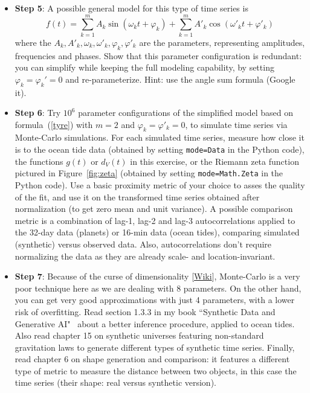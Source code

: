 \documentclass[oneside,10pt]{book}
\begin{document}
\begin{itemize}
\item[] {\bf Step 5}: A possible general model for this type of time series is
\begin{equation}
f(t) = \sum_{k=1}^m A_k \sin(\omega_kt + \varphi_k) + \sum_{k=1}^m A'_k \cos(\omega'_kt + \varphi'_k) \label{tyre}
\end{equation}
where the $A_k, A'_k, \omega_k,\omega'_k,\varphi_k,\varphi'_k$ are the parameters, representing amplitudes, frequencies and phases. Show that this parameter configuration is redundant:  you can simplify while keeping the full modeling capability, by setting
$\varphi_k = \varphi_k'=0$ and re-parameterize. Hint: use the angle sum formula (Google it).\vspace{1ex}
\item[] {\bf Step 6}: Try $10^6$ parameter configurations of the simplified model based on formula~(\ref{tyre}) 
with $m=2$ and $\varphi_k=\varphi'_k=0$, to
 simulate time series via \textcolor{index}{Monte-Carlo simulations}. For each simulated time series, measure how close it is to the ocean tide data (obtained by setting \texttt{mode=\textquotesingle Data\textquotesingle} in the Python code), the functions $g(t)$ or $d_V(t)$ in this exercise, or the Riemann zeta function pictured in Figure~\ref{fig:zeta} (obtained by setting
\texttt{mode=\textquotesingle Math.Zeta\textquotesingle} in the Python code). Use a basic proximity metric of your choice to asses the quality of the fit, and use it 
on the transformed time series obtained after normalization (to get zero mean and unit variance). A possible comparison metric is
a combination of  lag-1, lag-2 and lag-3 \textcolor{index}{autocorrelations} applied to the 32-day data (planets) or 16-min data (ocean tides), comparing simulated (synthetic) versus observed data. Also, autocorrelations don't require normalizing the data as they are already scale- and location-invariant.\vspace{1ex}
\item[] {\bf Step 7}: Because of the \textcolor{index}{curse of dimensionality} [\href{https://en.wikipedia.org/wiki/Curse_of_dimensionality}{Wiki}], Monte-Carlo is a very poor technique here as we are dealing with $8$ parameters. On the other hand, you can get very good approximations with just 4 parameters, with a lower risk of overfitting. Read
section 1.3.3 in my book ``Synthetic Data and Generative AI"~\cite{vgelsevier} about a better inference procedure, applied to ocean tides. 
Also read chapter 15 on synthetic universes featuring non-standard gravitation laws to generate different types of  synthetic time series. Finally, read chapter 6 on shape generation and comparison: it features a different type of metric to measure the distance between two objects, in this case the time series (their shape: real versus synthetic version). 
\end{itemize}
\end{document}
